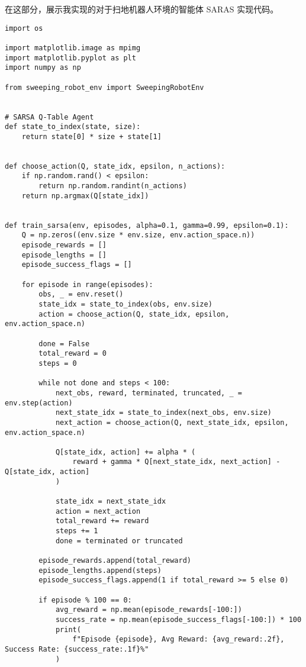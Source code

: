 在这部分，展示我实现的对于扫地机器人环境的智能体 SARAS 实现代码。

\begin{verbatim}
import os

import matplotlib.image as mpimg
import matplotlib.pyplot as plt
import numpy as np

from sweeping_robot_env import SweepingRobotEnv


# SARSA Q-Table Agent
def state_to_index(state, size):
    return state[0] * size + state[1]


def choose_action(Q, state_idx, epsilon, n_actions):
    if np.random.rand() < epsilon:
        return np.random.randint(n_actions)
    return np.argmax(Q[state_idx])


def train_sarsa(env, episodes, alpha=0.1, gamma=0.99, epsilon=0.1):
    Q = np.zeros((env.size * env.size, env.action_space.n))
    episode_rewards = []
    episode_lengths = []
    episode_success_flags = []

    for episode in range(episodes):
        obs, _ = env.reset()
        state_idx = state_to_index(obs, env.size)
        action = choose_action(Q, state_idx, epsilon, env.action_space.n)

        done = False
        total_reward = 0
        steps = 0

        while not done and steps < 100:
            next_obs, reward, terminated, truncated, _ = env.step(action)
            next_state_idx = state_to_index(next_obs, env.size)
            next_action = choose_action(Q, next_state_idx, epsilon, env.action_space.n)

            Q[state_idx, action] += alpha * (
                reward + gamma * Q[next_state_idx, next_action] - Q[state_idx, action]
            )

            state_idx = next_state_idx
            action = next_action
            total_reward += reward
            steps += 1
            done = terminated or truncated

        episode_rewards.append(total_reward)
        episode_lengths.append(steps)
        episode_success_flags.append(1 if total_reward >= 5 else 0)

        if episode % 100 == 0:
            avg_reward = np.mean(episode_rewards[-100:])
            success_rate = np.mean(episode_success_flags[-100:]) * 100
            print(
                f"Episode {episode}, Avg Reward: {avg_reward:.2f}, Success Rate: {success_rate:.1f}%"
            )


\end{verbatim}
